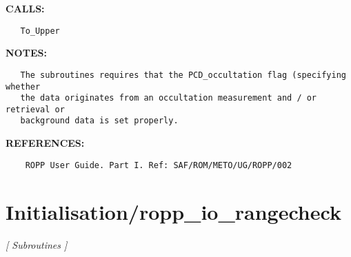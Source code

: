 \textbf{CALLS:}\hspace{0.08in}\begin{Verbatim}
   To_Upper
\end{Verbatim}
\textbf{NOTES:}\hspace{0.08in}\begin{Verbatim}
   The subroutines requires that the PCD_occultation flag (specifying whether
   the data originates from an occultation measurement and / or retrieval or
   background data is set properly.
\end{Verbatim}
\textbf{REFERENCES:}\hspace{0.08in}\begin{Verbatim}
    ROPP User Guide. Part I. Ref: SAF/ROM/METO/UG/ROPP/002
\end{Verbatim}
\section{Initialisation/ropp\_io\_rangecheck}
\textsl{[ Subroutines ]}

